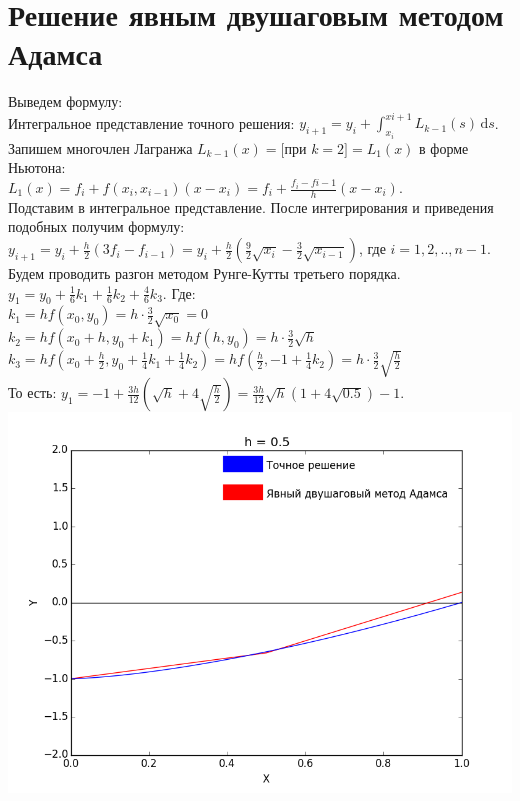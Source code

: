 \documentclass[12pt,a4paper]{article}
\begin{document}
    \section*{Решение явным двушаговым методом Адамса}
        Выведем формулу:\\
        Интегральное представление точного решения:
        $y_{i+1} = y_{i} + \int_{x_{i}}^{x{i+1}} \! L_{k-1}(s) \, \mathrm{d}s$.\\
        Запишем многочлен Лагранжа $L_{k-1}(x) = [$при $k = 2] = L_{1}(x)$
        в форме Ньютона:\\
        $L_{1}(x) = f_{i} + f(x_{i}, x_{i-1})(x - x_{i}) = f_{i} +
        \frac{f_{i} - f{i-1}}{h}(x - x_{i})$.\\
        Подставим в интегральное представление. После интегрирования и
        приведения подобных получим формулу:
        $y_{i+1} = y_{i} + \frac{h}{2} (3f_{i} - f_{i-1}) = y_{i} +
        \frac{h}{2}(\frac{9}{2}\sqrt{x_{i}} - \frac{3}{2}\sqrt{x_{i-1}})$,
        где $i = 1, 2, .., n-1$.\\
        Будем проводить разгон методом Рунге-Кутты третьего порядка.\\
        $y_{1} = y_{0} + \frac{1}{6} k_{1} + \frac{1}{6} k_{2} + \frac{4}{6} k_{3}$.
        Где:\\
        $k_{1} = hf(x_{0}, y_{0}) = h \cdot \frac{3}{2} \sqrt{x_{0}} = 0$\\
        $k_{2} = hf(x_{0} + h, y_{0} + k_{1}) = hf(h, y_{0}) = h \cdot \frac{3}{2} \sqrt{h}$\\
        $k_{3} = hf(x_{0} + \frac{h}{2}, y_{0} + \frac{1}{4}k_{1} + \frac{1}{4}k_{2}) =
        hf(\frac{h}{2}, -1 + \frac{1}{4}k_{2}) = h \cdot \frac{3}{2} \sqrt{\frac{h}{2}}$\\
        То есть: $y_{1} = -1 + \frac{3h}{12}(\sqrt{h} + 4\sqrt{\frac{h}{2}}) =
        \frac{3h}{12}\sqrt{h}(1 + 4\sqrt{0.5}) - 1$.\\
        \includegraphics[scale=0.45]{adamsGraph_Step=0_5}
\end{document}
